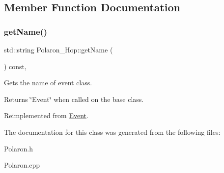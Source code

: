 \subsection{Member Function Documentation}
\mbox{\label{class_polaron___hop_adbb1a3f86bd6a2dd21849bfec5598d70}} 
\subsubsection{\texorpdfstring{get\+Name()}{getName()}}
{\footnotesize\ttfamily std\+::string Polaron\+\_\+\+Hop\+::get\+Name (\begin{DoxyParamCaption}{ }\end{DoxyParamCaption}) const\hspace{0.3cm}{\ttfamily [inline]}, {\ttfamily [virtual]}}



Gets the name of event class. 

\begin{DoxyReturn}{Returns}
\char`\"{}\+Event\char`\"{} when called on the base class. 
\end{DoxyReturn}


Reimplemented from \hyperlink{class_event_a8c38a406d844d05eac1ef007bad2487f}{Event}.



The documentation for this class was generated from the following files\+:\begin{DoxyCompactItemize}
\item 
Polaron.\+h\item 
Polaron.\+cpp\end{DoxyCompactItemize}
